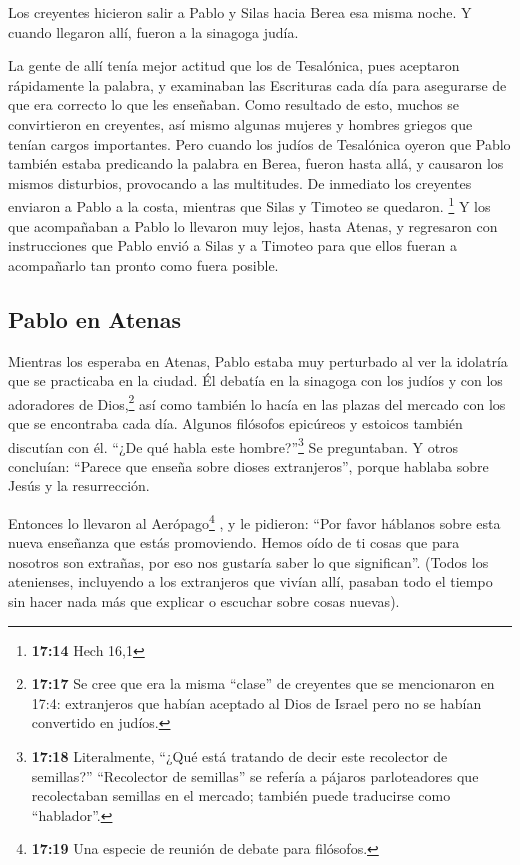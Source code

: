  Los creyentes hicieron salir a Pablo y Silas hacia Berea
esa misma noche. Y cuando llegaron allí, fueron a la sinagoga judía.

 La gente de allí tenía mejor actitud que los de
Tesalónica, pues aceptaron rápidamente la palabra, y examinaban las
Escrituras cada día para asegurarse de que era correcto lo que les
enseñaban.  Como resultado de esto, muchos se
convirtieron en creyentes, así mismo algunas mujeres y hombres griegos
que tenían cargos importantes.  Pero cuando los judíos de
Tesalónica oyeron que Pablo también estaba predicando la palabra en
Berea, fueron hasta allá, y causaron los mismos disturbios, provocando a
las multitudes.  De inmediato los creyentes enviaron a
Pablo a la costa, mientras que Silas y Timoteo se quedaron. \footnote{\textbf{17:14}
  Hech 16,1}  Y los que acompañaban a Pablo lo llevaron
muy lejos, hasta Atenas, y regresaron con instrucciones que Pablo envió
a Silas y a Timoteo para que ellos fueran a acompañarlo tan pronto como
fuera posible.

\hypertarget{pablo-en-atenas}{%
\subsection{Pablo en Atenas}\label{pablo-en-atenas}}

 Mientras los esperaba en Atenas, Pablo estaba muy
perturbado al ver la idolatría que se practicaba en la ciudad.
 Él debatía en la sinagoga con los judíos y con los
adoradores de Dios,\footnote{\textbf{17:17} Se cree que era la misma
  ``clase'' de creyentes que se mencionaron en 17:4: extranjeros que
  habían aceptado al Dios de Israel pero no se habían convertido en
  judíos.} así como también lo hacía en las plazas del mercado con los
que se encontraba cada día.  Algunos filósofos epicúreos
y estoicos también discutían con él. ``¿De qué habla este
hombre?''\footnote{\textbf{17:18} Literalmente, ``¿Qué está tratando de
  decir este recolector de semillas?'' ``Recolector de semillas'' se
  refería a pájaros parloteadores que recolectaban semillas en el
  mercado; también puede traducirse como ``hablador''.} Se preguntaban.
Y otros concluían: ``Parece que enseña sobre dioses extranjeros'',
porque hablaba sobre Jesús y la resurrección.

 Entonces lo llevaron al Aerópago\footnote{\textbf{17:19}
  Una especie de reunión de debate para filósofos.} , y le pidieron:
``Por favor háblanos sobre esta nueva enseñanza que estás promoviendo.
 Hemos oído de ti cosas que para nosotros son extrañas,
por eso nos gustaría saber lo que significan''.  (Todos
los atenienses, incluyendo a los extranjeros que vivían allí, pasaban
todo el tiempo sin hacer nada más que explicar o escuchar sobre cosas
nuevas).

